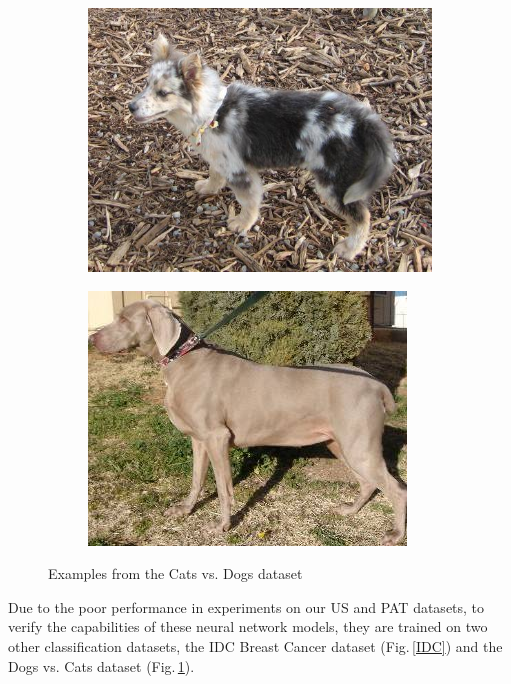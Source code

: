 \begin{figure}[h]
\begin{subfigure}[b]{.2\linewidth}
\end{subfigure}
\begin{subfigure}[b]{.2\linewidth}
\includegraphics[width=\linewidth]{Figs/dog4133.jpg}
\end{subfigure}
\begin{subfigure}[b]{.2\linewidth}
\includegraphics[width=\linewidth]{Figs/dog1178.jpg}
\end{subfigure}
\caption{Examples from the Cats vs. Dogs dataset}
\label{catdog}
\end{figure}

Due to the poor performance in experiments on our US and PAT datasets, to verify the capabilities of these neural network models, they are trained on two other classification datasets, the IDC Breast Cancer dataset \citep{Janowczyk2016} (Fig.\,\ref{IDC}) and the Dogs vs. Cats dataset \citep{catdog}  (Fig.\,\ref{catdog}).


